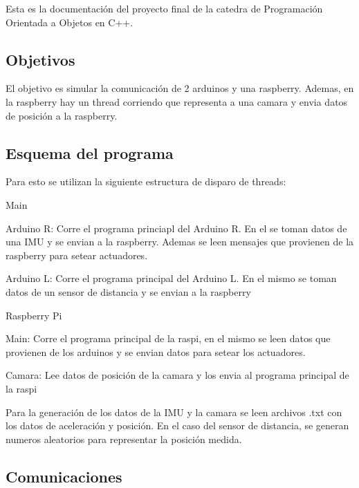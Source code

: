 Esta es la documentación del proyecto final de la catedra de Programación Orientada a Objetos en C++.

\subsection*{Objetivos}



El objetivo es simular la comunicación de 2 arduinos y una raspberry. Ademas, en la raspberry hay un thread corriendo que representa a una camara y envia datos de posición a la raspberry.

\subsection*{Esquema del programa}

Para esto se utilizan la siguiente estructura de disparo de threads\+:
\begin{DoxyItemize}
\item Main
\begin{DoxyItemize}
\item Arduino R\+: Corre el programa princiapl del Arduino R. En el se toman datos de una I\+MU y se envian a la raspberry. Ademas se leen mensajes que provienen de la raspberry para setear actuadores.
\item Arduino L\+: Corre el programa principal del Arduino L. En el mismo se toman datos de un sensor de distancia y se envian a la raspberry
\item Raspberry Pi
\begin{DoxyItemize}
\item Main\+: Corre el programa principal de la raspi, en el mismo se leen datos que provienen de los arduinos y se envian datos para setear los actuadores.
\item Camara\+: Lee datos de posición de la camara y los envia al programa principal de la raspi
\end{DoxyItemize}
\end{DoxyItemize}
\end{DoxyItemize}

Para la generación de los datos de la I\+MU y la camara se leen archivos .txt con los datos de aceleración y posición. En el caso del sensor de distancia, se generan numeros aleatorios para representar la posición medida.

\subsection*{Comunicaciones}

